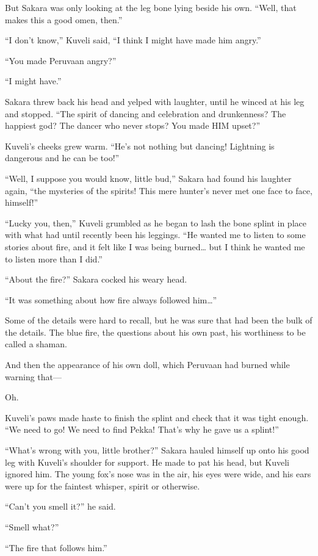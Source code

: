 But Sakara was only looking at the leg bone lying beside his own. ``Well, that makes this a good omen, then.''

``I don't know,'' Kuveli said, ``I think I might have made him angry.''

``You made Peruvaan angry?''

``I might have.''

Sakara threw back his head and yelped with laughter, until he winced at his leg and stopped. ``The spirit of dancing and celebration and drunkenness? The happiest god? The dancer who never stops? You made HIM upset?''

Kuveli's cheeks grew warm. ``He's not nothing but dancing! Lightning is dangerous and he can be too!''

``Well, I suppose you would know, little bud,'' Sakara had found his laughter again, ``the mysteries of the spirits! This mere hunter's never met one face to face, himself!''

``Lucky you, then,'' Kuveli grumbled as he began to lash the bone splint in place with what had until recently been his leggings. ``He wanted me to listen to some stories about fire, and it felt like I was being burned\ldots{} but I think he wanted me to listen more than I did.''

``About the fire?'' Sakara cocked his weary head.

``It was something about how fire always followed him\ldots''

Some of the details were hard to recall, but he was sure that had been the bulk of the details. The blue fire, the questions about his own past, his worthiness to be called a shaman.

And then the appearance of his own doll, which Peruvaan had burned while warning that---

Oh.

Kuveli's paws made haste to finish the splint and check that it was tight enough. ``We need to go! We need to find Pekka! That's why he gave us a splint!''

``What's wrong with you, little brother?'' Sakara hauled himself up onto his good leg with Kuveli's shoulder for support. He made to pat his head, but Kuveli ignored him. The young fox's nose was in the air, his eyes were wide, and his ears were up for the faintest whisper, spirit or otherwise.

``Can't you smell it?'' he said.

``Smell what?''

``The fire that follows him.''

